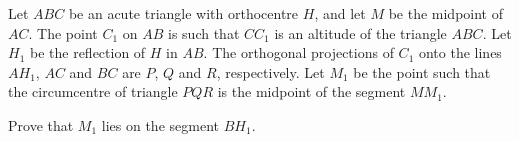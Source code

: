 Let $ABC$ be an acute triangle with orthocentre $H$,  and let $M$ be the midpoint of $AC$. The point $C_1$ on $AB$ is such that $CC_1$ is an altitude of the triangle $ABC$. Let $H_1$ be the reflection of $H$ in $AB$. The orthogonal projections of $C_1$ onto the lines $AH_1$,  $AC$ and $BC$ are $P$,  $Q$ and $R$,  respectively. Let $M_1$ be the point such that the circumcentre  of triangle $PQR$ is the midpoint of the segment $MM_1$.

Prove that $M_1$ lies on the segment $BH_1$.